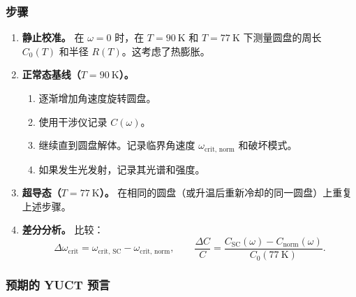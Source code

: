 \documentclass[12pt,a4paper]{article}
\begin{document}
	\subsubsection{步骤}
	
	\begin{enumerate}
		\item \textbf{静止校准。} 在 \(\omega = 0\) 时，在 \(T = 90\ \text{K}\) 和 \(T = 77\ \text{K}\) 下测量圆盘的周长 \(C_0(T)\) 和半径 \(R(T)\)。这考虑了热膨胀。
		
		\item \textbf{正常态基线（\(T = 90\ \text{K}\)）。} 
		\begin{enumerate}
			\item 逐渐增加角速度旋转圆盘。
			\item 使用干涉仪记录 \(C(\omega)\)。
			\item 继续直到圆盘解体。记录临界角速度 \(\omega_{\text{crit, norm}}\) 和破坏模式。
			\item 如果发生光发射，记录其光谱和强度。
		\end{enumerate}
		
		\item \textbf{超导态（\(T = 77\ \text{K}\)）。} 在相同的圆盘（或升温后重新冷却的同一圆盘）上重复上述步骤。
		
		\item \textbf{差分分析。} 比较：
		\[
		\Delta \omega_{\text{crit}} = \omega_{\text{crit, SC}} - \omega_{\text{crit, norm}},\qquad
		\frac{\Delta C}{C} = \frac{C_{\text{SC}}(\omega) - C_{\text{norm}}(\omega)}{C_0(77\ \text{K})}.
		\]
	\end{enumerate}
	
	\subsubsection{预期的 YUCT 预言}
	
\end{document}

